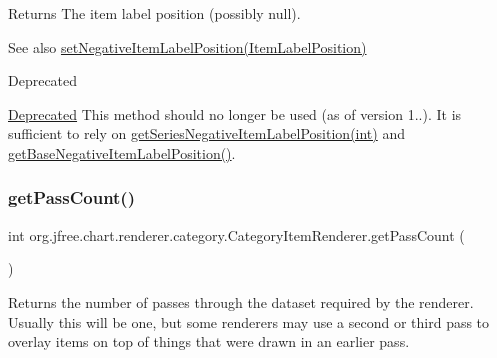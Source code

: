 \begin{DoxyReturn}{Returns}
The item label position (possibly {\ttfamily null}).
\end{DoxyReturn}
\begin{DoxySeeAlso}{See also}
\mbox{\hyperlink{interfaceorg_1_1jfree_1_1chart_1_1renderer_1_1category_1_1_category_item_renderer_acda1ea9e4c2f56fd66994a59c0f4c60a}{set\+Negative\+Item\+Label\+Position(\+Item\+Label\+Position)}}
\end{DoxySeeAlso}
\begin{DoxyRefDesc}{Deprecated}
\item[\mbox{\hyperlink{deprecated__deprecated000177}{Deprecated}}]This method should no longer be used (as of version 1..). It is sufficient to rely on \mbox{\hyperlink{interfaceorg_1_1jfree_1_1chart_1_1renderer_1_1category_1_1_category_item_renderer_a4d25d81d8fd4ce5d4b18f49663039e49}{get\+Series\+Negative\+Item\+Label\+Position(int)}} and \mbox{\hyperlink{interfaceorg_1_1jfree_1_1chart_1_1renderer_1_1category_1_1_category_item_renderer_a07449f382743d7ef7196b59f592c2b80}{get\+Base\+Negative\+Item\+Label\+Position()}}. \end{DoxyRefDesc}
\mbox{\label{interfaceorg_1_1jfree_1_1chart_1_1renderer_1_1category_1_1_category_item_renderer_aa8cd580a0e3836808f97f479f2c999bc}} 
\subsubsection{\texorpdfstring{get\+Pass\+Count()}{getPassCount()}}
{\footnotesize\ttfamily int org.\+jfree.\+chart.\+renderer.\+category.\+Category\+Item\+Renderer.\+get\+Pass\+Count (\begin{DoxyParamCaption}{ }\end{DoxyParamCaption})}

Returns the number of passes through the dataset required by the renderer. Usually this will be one, but some renderers may use a second or third pass to overlay items on top of things that were drawn in an earlier pass.

